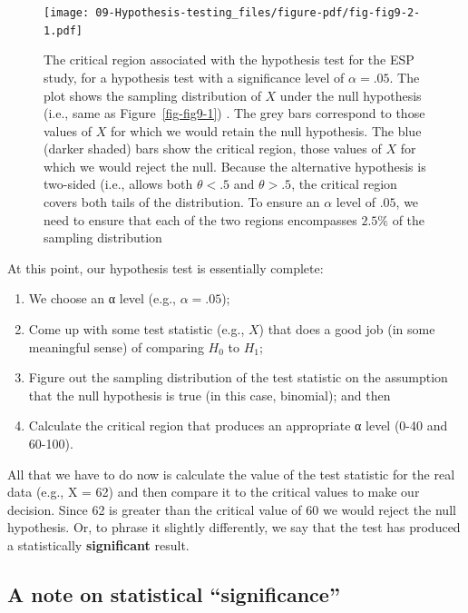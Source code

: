 \documentclass[
  a4paper,
]{book}
\providecommand{\tightlist}{%
  \setlength{\itemsep}{0pt}\setlength{\parskip}{0pt}}\usepackage{longtable,booktabs,array}
\begin{document}
\begin{figure}

\texttt{[image: 09-Hypothesis-testing\_files/figure-pdf/fig-fig9-2-1.pdf]} \hfill{}

\caption{\label{fig-fig9-2}The critical region associated with the
hypothesis test for the ESP study, for a hypothesis test with a
significance level of \(\alpha = .05\). The plot shows the sampling
distribution of \(X\) under the null hypothesis (i.e., same as
Figure~\ref{fig-fig9-1}) . The grey bars correspond to those values of
\(X\) for which we would retain the null hypothesis. The blue (darker
shaded) bars show the critical region, those values of \(X\) for which
we would reject the null. Because the alternative hypothesis is
two-sided (i.e., allows both \(\theta < .5\) and \(\theta > .5\), the
critical region covers both tails of the distribution. To ensure an
\(\alpha\) level of \(.05\), we need to ensure that each of the two
regions encompasses \(2.5\%\) of the sampling distribution}

\end{figure}

At this point, our hypothesis test is essentially complete:

\begin{enumerate}
\def\labelenumi{\arabic{enumi}.}
\tightlist
\item
  We choose an α level (e.g., \(\alpha = .05\));
\item
  Come up with some test statistic (e.g., \(X\)) that does a good job
  (in some meaningful sense) of comparing \(H_0\) to \(H_1\);
\item
  Figure out the sampling distribution of the test statistic on the
  assumption that the null hypothesis is true (in this case, binomial);
  and then
\item
  Calculate the critical region that produces an appropriate α level
  (0-40 and 60-100).
\end{enumerate}

All that we have to do now is calculate the value of the test statistic
for the real data (e.g., X = 62) and then compare it to the critical
values to make our decision. Since 62 is greater than the critical value
of 60 we would reject the null hypothesis. Or, to phrase it slightly
differently, we say that the test has produced a statistically
\textbf{significant} result.

\hypertarget{a-note-on-statistical-significance}{%
\subsection{A note on statistical
``significance''}\label{a-note-on-statistical-significance}}
\end{document}

